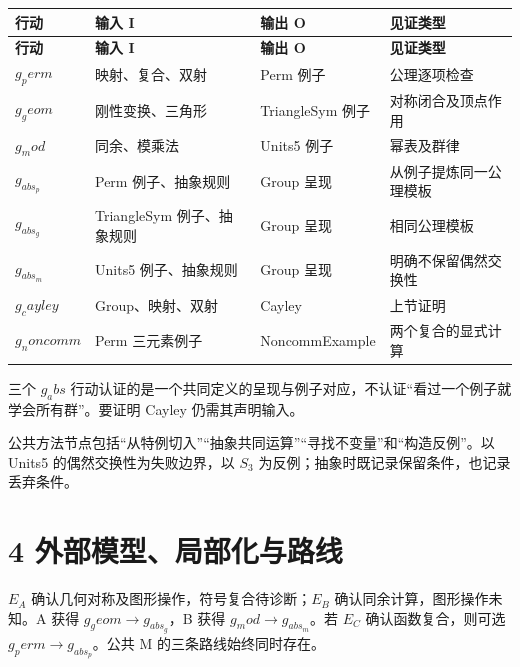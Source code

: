 \documentclass[UTF8,a4paper,zihao=-4,fontset=windows,openany]{ctexbook}
\def\mathrm#1{#1}%
\begin{document}
\begingroup\small\setlength{\tabcolsep}{4pt}
\begin{longtable}{>{\raggedright\arraybackslash}p{}>{\raggedright\arraybackslash}p{}>{\raggedright\arraybackslash}p{}>{\raggedright\arraybackslash}p{}}
\toprule
\textbf{行动} & \textbf{输入 I} & \textbf{输出 O} & \textbf{见证类型} \\
\midrule
\endfirsthead
\toprule
\textbf{行动} & \textbf{输入 I} & \textbf{输出 O} & \textbf{见证类型} \\
\midrule
\endhead
\bottomrule
\endfoot
\bottomrule
\endlastfoot
\(g_\mathrm{perm}\) & 映射、复合、双射 & Perm 例子 & 公理逐项检查 \\
\(g_\mathrm{geom}\) & 刚性变换、三角形 & TriangleSym 例子 & 对称闭合及顶点作用 \\
\(g_\mathrm{mod}\) & 同余、模乘法 & Units5 例子 & 幂表及群律 \\
\(g_{\mathrm{abs}_p}\) & Perm 例子、抽象规则 & Group 呈现 & 从例子提炼同一公理模板 \\
\(g_{\mathrm{abs}_g}\) & TriangleSym 例子、抽象规则 & Group 呈现 & 相同公理模板 \\
\(g_{\mathrm{abs}_m}\) & Units5 例子、抽象规则 & Group 呈现 & 明确不保留偶然交换性 \\
\(g_\mathrm{cayley}\) & Group、映射、双射 & Cayley & 上节证明 \\
\(g_\mathrm{noncomm}\) & Perm 三元素例子 & NoncommExample & 两个复合的显式计算 \\
\end{longtable}
\endgroup

三个 \(g_\mathrm{abs}\) 行动认证的是一个共同定义的呈现与例子对应，不认证“看过一个例子就学会所有群”。要证明 Cayley 仍需其声明输入。

公共方法节点包括“从特例切入”“抽象共同运算”“寻找不变量”和“构造反例”。以 Units5 的偶然交换性为失败边界，以 \(S_{3}\) 为反例；抽象时既记录保留条件，也记录丢弃条件。

\section{4 外部模型、局部化与路线}
\(E_A\) 确认几何对称及图形操作，符号复合待诊断；\(E_B\) 确认同余计算，图形操作未知。A 获得 \(g_\mathrm{geom}\to g_{\mathrm{abs}_g}\)，B 获得 \(g_\mathrm{mod}\to g_{\mathrm{abs}_m}\)。若 \(E_C\) 确认函数复合，则可选 \(g_\mathrm{perm}\to g_{\mathrm{abs}_p}\)。公共 M 的三条路线始终同时存在。
\end{document}
